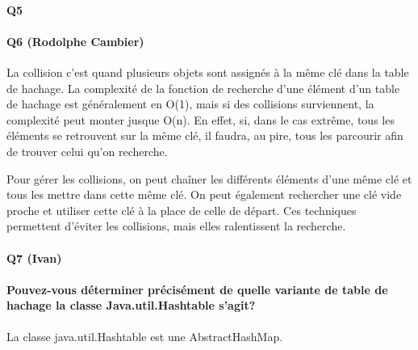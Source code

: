 \documentclass[a4paper]{article}
\begin{document}
\paragraph{Q5}

\paragraph{Q6 (Rodolphe Cambier)}
La collision c'est quand plusieurs objets sont assignés à la même clé dans la table de hachage. La complexité de la fonction de recherche d'une élément d'un table de hachage est généralement en O(1), mais si des collisions surviennent, la complexité peut monter jusque O(n). En effet, si, dans le cas extrême, tous les éléments se retrouvent sur la même clé, il faudra, au pire, tous les parcourir afin de trouver celui qu'on recherche. 

Pour gérer les collisions, on peut chaîner les différents éléments d'une même clé et tous les mettre dans cette même clé.
On peut également rechercher une clé vide proche et utiliser cette clé à la place de celle de départ. Ces techniques permettent d'éviter les collisions, mais elles ralentissent la recherche.

\paragraph{Q7 (Ivan)}

\paragraph*{Pouvez-vous déterminer précisément de quelle variante de table de hachage la classe Java.util.Hashtable s'agit?}

La classe java.util.Hashtable est une AbstractHashMap. 
\end{document}
